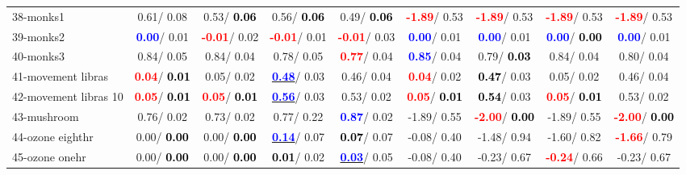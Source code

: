 \begin{table}[h]
\begin{center}
\begin{tabular}{lc|c|c|c|c|c|c|c}
38-monks1 &   0.61/  0.08 &   0.53/\textcolor{black}{\textbf{  0.06}} &   0.56/\textcolor{black}{\textbf{  0.06}} &   0.49/\textcolor{black}{\textbf{  0.06}} & \textcolor{red}{\textbf{ -1.89}}/  0.53 & \textcolor{red}{\textbf{ -1.89}}/  0.53 & \textcolor{red}{\textbf{ -1.89}}/  0.53 & \textcolor{red}{\textbf{ -1.89}}/  0.53 \\
39-monks2 & \textcolor{blue}{\textbf{  0.00}}/  0.01 & \textcolor{red}{\textbf{ -0.01}}/  0.02 & \textcolor{red}{\textbf{ -0.01}}/  0.01 & \textcolor{red}{\textbf{ -0.01}}/  0.03 & \textcolor{blue}{\textbf{  0.00}}/  0.01 & \textcolor{blue}{\textbf{  0.00}}/  0.01 & \textcolor{blue}{\textbf{  0.00}}/\textcolor{black}{\textbf{  0.00}} & \textcolor{blue}{\textbf{  0.00}}/  0.01 \\ \hline
40-monks3 &   0.84/  0.05 &   0.84/  0.04 &   0.78/  0.05 & \textcolor{red}{\textbf{  0.77}}/  0.04 & \textcolor{blue}{\textbf{  0.85}}/  0.04 &   0.79/\textcolor{black}{\textbf{  0.03}} &   0.84/  0.04 &   0.80/  0.04 \\
41-movement libras & \textcolor{red}{\textbf{  0.04}}/\textcolor{black}{\textbf{  0.01}} &   0.05/  0.02 & \underline{\textcolor{blue}{\textbf{  0.48}}}/  0.03 &   0.46/  0.04 & \textcolor{red}{\textbf{  0.04}}/  0.02 & \textcolor{black}{\textbf{  0.47}}/  0.03 &   0.05/  0.02 &   0.46/  0.04 \\
42-movement libras 10 & \textcolor{red}{\textbf{  0.05}}/\textcolor{black}{\textbf{  0.01}} & \textcolor{red}{\textbf{  0.05}}/\textcolor{black}{\textbf{  0.01}} & \underline{\textcolor{blue}{\textbf{  0.56}}}/  0.03 &   0.53/  0.02 & \textcolor{red}{\textbf{  0.05}}/\textcolor{black}{\textbf{  0.01}} & \textcolor{black}{\textbf{  0.54}}/  0.03 & \textcolor{red}{\textbf{  0.05}}/\textcolor{black}{\textbf{  0.01}} &   0.53/  0.02 \\
43-mushroom &   0.76/  0.02 &   0.73/  0.02 &   0.77/  0.22 & \textcolor{blue}{\textbf{  0.87}}/  0.02 &  -1.89/  0.55 & \textcolor{red}{\textbf{ -2.00}}/\textcolor{black}{\textbf{  0.00}} &  -1.89/  0.55 & \textcolor{red}{\textbf{ -2.00}}/\textcolor{black}{\textbf{  0.00}} \\
44-ozone eighthr &   0.00/\textcolor{black}{\textbf{  0.00}} &   0.00/\textcolor{black}{\textbf{  0.00}} & \underline{\textcolor{blue}{\textbf{  0.14}}}/  0.07 & \textcolor{black}{\textbf{  0.07}}/  0.07 &  -0.08/  0.40 &  -1.48/  0.94 &  -1.60/  0.82 & \textcolor{red}{\textbf{ -1.66}}/  0.79 \\
45-ozone onehr &   0.00/\textcolor{black}{\textbf{  0.00}} &   0.00/\textcolor{black}{\textbf{  0.00}} & \textcolor{black}{\textbf{  0.01}}/  0.02 & \underline{\textcolor{blue}{\textbf{  0.03}}}/  0.05 &  -0.08/  0.40 &  -0.23/  0.67 & \textcolor{red}{\textbf{ -0.24}}/  0.66 &  -0.23/  0.67 \\

\end{tabular}
\end{center}
\end{table}
